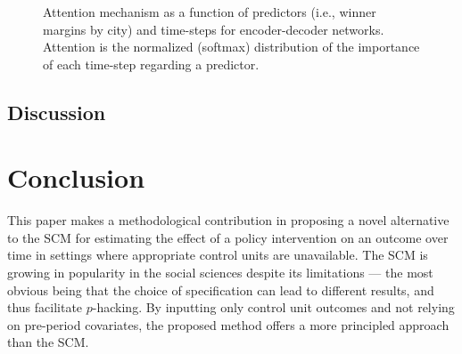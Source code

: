 \documentclass[hidelinks,12pt]{article}
\begin{document}
\begin{figure}[htbp]
	\centering
	\caption{Attention mechanism as a function of predictors (i.e., winner margins by city) and time-steps for encoder-decoder
		networks. Attention is the normalized (softmax) distribution of the importance of each time-step regarding a predictor.\label{attn-plot}} 
\end{figure}

\subsection{Discussion}





\section{Conclusion} \label{conclusion}

This paper makes a methodological contribution in proposing a novel alternative to the SCM for estimating the effect of a policy intervention on an outcome over time in settings where appropriate control units are unavailable. The SCM is growing in popularity in the social sciences despite its limitations --- the most obvious being that the choice of specification can lead to different results, and thus facilitate $p$-hacking. By inputting only control unit outcomes and not relying on pre-period covariates, the proposed method offers a more principled approach than the SCM. 
\end{document}
